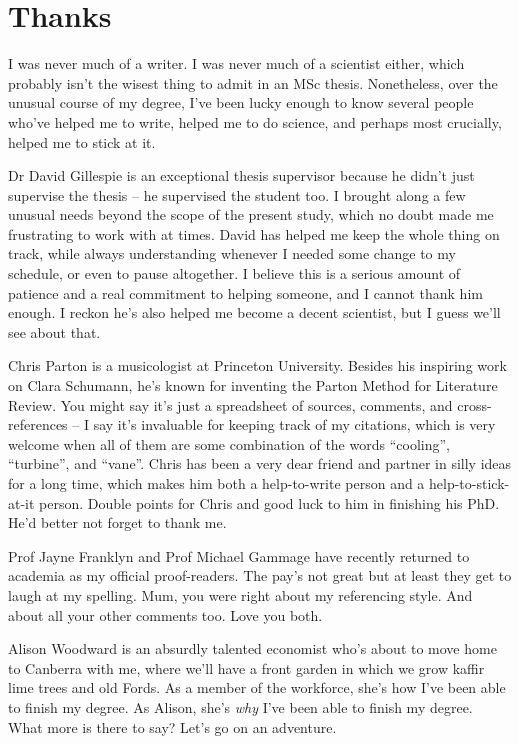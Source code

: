 \documentclass[a4paper, 11pt, oneside]{report}
\begin{document}
\chapter*{Thanks}


I was never much of a writer. I was never much of a scientist either, which probably isn't the wisest thing to admit in an MSc thesis. Nonetheless, over the unusual course of my degree, I've been lucky enough to know several people who've helped me to write, helped me to do science, and perhaps most crucially, helped me to stick at it.

Dr David Gillespie is an exceptional thesis supervisor because he didn't just supervise the thesis -- he supervised the student too. I brought along a few unusual needs beyond the scope of the present study, which no doubt made me frustrating to work with at times. David has helped me keep the whole thing on track, while always understanding whenever I needed some change to my schedule, or even to pause altogether. I believe this is a serious amount of patience and a real commitment to helping someone, and I cannot thank him enough. I reckon he's also helped me become a decent scientist, but I guess we'll see about that.

Chris Parton is a musicologist at Princeton University. Besides his inspiring work on Clara Schumann, he's known for inventing the Parton Method for Literature Review. You might say it's just a spreadsheet of sources, comments, and cross-references -- I say it's invaluable for keeping track of my citations, which is very welcome when all of them are some combination of the words ``cooling'', ``turbine'', and ``vane''. Chris has been a very dear friend and partner in silly ideas for a long time, which makes him both a help-to-write person and a help-to-stick-at-it person. Double points for Chris and good luck to him in finishing his PhD. He'd better not forget to thank me.

Prof Jayne Franklyn and Prof Michael Gammage have recently returned to academia as my official proof-readers. The pay's not great but at least they get to laugh at my spelling. Mum, you were right about my referencing style. And about all your other comments too. Love you both.

Alison Woodward is an absurdly talented economist who's about to move home to Canberra with me, where we'll have a front garden in which we grow kaffir lime trees and old Fords. As a member of the workforce, she's how I've been able to finish my degree. As Alison, she's \textit{why} I've been able to finish my degree. What more is there to say? Let's go on an adventure.
\end{document}
